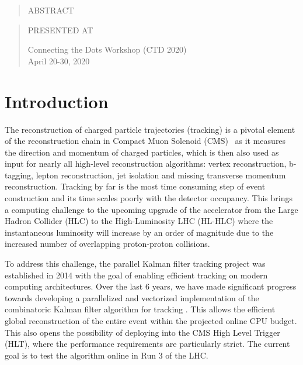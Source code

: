 \documentclass[10pt, paper=a4, UKenglish]{article}
\newenvironment{Abstract}{\begin{quotation} \begin{center} 
             \large ABSTRACT \end{center}\bigskip 
   \begin{center}\begin{large}}{\end{large}\end{center}\end{quotation}}
\newenvironment{Presented}{\begin{quotation} \begin{center} 
             PRESENTED AT\end{center}\bigskip 
      \begin{center}\begin{large}}{\end{large}\end{center} \end{quotation}}
\newcommand{\conference}{Connecting the Dots Workshop (CTD 2020)\\
April 20-30, 2020}
\begin{document}
\begin{titlepage}
\begin{Abstract}
\end{Abstract}
\vfill

\begin{Presented}
\conference
\end{Presented}
\vfill
\end{titlepage}
\def\thefootnote{\fnsymbol{footnote}}
\setcounter{footnote}{0}
%

\normalsize 


\section{Introduction}
\label{intro}
The reconstruction of charged particle trajectories (tracking) is a pivotal element of the reconstruction chain in Compact Muon Solenoid (CMS)~\cite{Chatrchyan:2008aa} as it measures the direction and momentum of charged particles, which is then also used as input for nearly all high-level reconstruction algorithms: vertex reconstruction, b-tagging, lepton reconstruction, jet isolation and missing transverse momentum reconstruction. Tracking by far is the most time consuming step of event construction and its time scales poorly with the detector occupancy. This brings a computing challenge to the upcoming upgrade of the accelerator from the Large Hadron Collider (HLC) to the High-Luminosity LHC (HL-HLC) where the instantaneous luminosity will increase by an order of magnitude due to the increased number of overlapping proton-proton collisions.

To address this challenge, the parallel Kalman filter tracking project \mkFit was established in 2014 with the goal of enabling efficient tracking on modern computing architectures. Over the last 6 years, we have made significant progress towards developing a parallelized and vectorized implementation of the combinatoric Kalman filter algorithm for tracking \cite{Cerati_2017,Cerati_2019,2019arXiv190611744C,2020arXiv200206295C}. This allows the efficient global reconstruction of the entire event within the projected online CPU budget. This also opens the possibility of deploying \mkFit into the CMS High Level Trigger (HLT), where the performance requirements are particularly strict. The current goal is to test the algorithm online in Run 3 of the LHC. 
\end{document}
